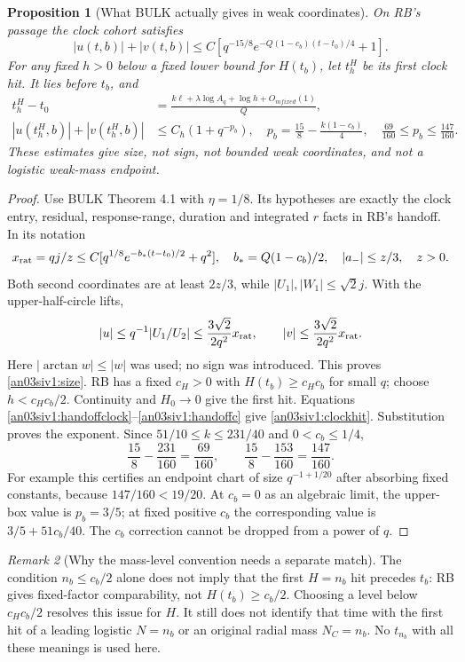 \documentclass[11pt]{article}
\numberwithin{equation}{section}
\newtheorem{proposition}{Proposition}[section]
\theoremstyle{remark}\newtheorem{remark}[proposition]{Remark}
\begin{document}
\begin{proposition}[What BULK actually gives in weak coordinates]
\label{an03siv1:bulksize}
On RB's passage the clock cohort satisfies
\begin{equation}
 |u(t,b)|+|v(t,b)|
 \le C\left[q^{-15/8}e^{-Q(1-c_b)(t-t_0)/4}+1\right].
 \label{an03siv1:size}
\end{equation}
For any fixed $h>0$ below a fixed lower bound for $H(t_b)$,
let $t_h^H$ be its first clock hit. It lies before $t_b$, and
\begin{align}
 t_h^H-t_0&=\frac{k\ell+\lambda\log A_q+\log h+O_{
m fixed}(1)}Q,
 \label{an03siv1:clockhit}\\
 |u(t_h^H,b)|+|v(t_h^H,b)|&\le C_h(1+q^{-p_b}),\quad
 p_b=\frac{15}{8}-\frac{k(1-c_b)}4,
 \quad \frac{69}{160}\le p_b\le\frac{147}{160}.
 \label{an03siv1:endpointsize}
\end{align}
These estimates give size, not sign, not bounded weak coordinates,
and not a logistic weak-mass endpoint.
\end{proposition}
\begin{proof}
Use BULK Theorem 4.1 with $\eta=1/8$. Its hypotheses are exactly
the clock entry, residual, response-range, duration and integrated
$r$ facts in RB's handoff. In its notation
\[
 x_{\rm rat}=qj/z\le C[q^{1/8}e^{-b_*(t-t_0)/2}+q^2],
 \quad b_*=Q(1-c_b)/2,\quad |a_-|\le z/3,\quad z>0.
\]
Both second coordinates are at least $2z/3$, while
$|U_1|,|W_1|\le\sqrt2j$. With the upper-half-circle lifts,
\[
 |u|\le q^{-1}|U_1/U_2|\le\frac{3\sqrt2}{2q^2}x_{\rm rat},
 \qquad
 |v|\le\frac{3\sqrt2}{2q^2}x_{\rm rat}.
\]
Here $|\arctan w|\le|w|$ was used; no sign was introduced.
This proves \eqref{an03siv1:size}.
RB has a fixed $c_H>0$ with $H(t_b)\ge c_Hc_b$ for small $q$;
choose $h<c_Hc_b/2$. Continuity and $H_0\to0$ give the first hit.
Equations \eqref{an03siv1:handoffclock}--\eqref{an03siv1:handoffc}
give \eqref{an03siv1:clockhit}. Substitution proves the exponent.
Since $51/10\le k\le231/40$ and $0<c_b\le1/4$,
\[
 \frac{15}{8}-\frac{231}{160}=\frac{69}{160},\qquad
 \frac{15}{8}-\frac{153}{160}=\frac{147}{160}.
\]
For example this certifies an endpoint chart of size
$q^{-1+1/20}$ after absorbing fixed constants, because
$147/160<19/20$. At $c_b=0$ as an algebraic limit, the upper-box
value is $p_b=3/5$; at fixed positive $c_b$ the corresponding
value is $3/5+51c_b/40$. The $c_b$ correction cannot be dropped
from a power of $q$.
\end{proof}

\begin{remark}[Why the mass-level convention needs a separate match]
\label{an03siv1:masslevel}
The condition $n_b\le c_b/2$ alone does not imply that the first
$H=n_b$ hit precedes $t_b$: RB gives fixed-factor comparability,
not $H(t_b)\ge c_b/2$. Choosing a level below $c_Hc_b/2$ resolves
this issue for $H$. It still does not identify that time with the
first hit of a leading logistic $N=n_b$ or an original radial mass
$N_C=n_b$. No $t_{n_b}$ with all these meanings is used here.
\end{remark}
\end{document}

